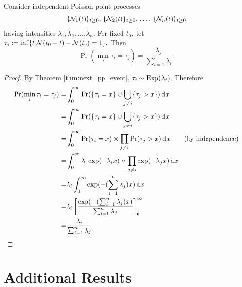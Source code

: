 \begin{theorem}
    \label{thm:which_ppp}
    Consider independent Poisson point processes
    $$\{\mathcal{N}_1(t)\}_{t\geq0},\, \{\mathcal{N}_2(t)\}_{t\geq0},\, \dots,\,
        \{\mathcal{N}_n(t)\}_{t\geq0}$$
    having intensities $\lambda_1, \lambda_2, \dots, \lambda_n.$ For fixed
    $t_0,$ let $\tau_i:=\inf\{t | \mathcal{N}(t_0 + t) - \mathcal{N}(t_0) = 1\}.$
    Then
    $$\Pr(\min_i{\tau_i} = \tau_j)
        = \frac{\lambda_j}{\sum_{i = 1}^n \lambda_i}.$$
\end{theorem}
\begin{proof}
    By Theorem \ref{thm:next_pp_event}, $\tau_i \sim \operatorname{Exp}(\lambda_i).$
    Therefore \begin{align*}
        \Pr(\min_i{\tau_i} = \tau_j) = & \int_0^\infty \Pr(\{\tau_i = x\} \cup \bigcup_{j\neq i}\{\tau_j > x\}) \diff x                    \\
        =                              & \int_0^\infty \Pr(\{\tau_i = x\} \cup \bigcup_{j\neq i}\{\tau_j > x\}) \diff x                    \\
        =                              & \int_0^\infty \Pr(\tau_i = x)\times \prod_{j\neq i}\Pr(\tau_j > x) \diff x\tag{by independence}   \\
        =                              & \int_0^\infty \lambda_i\exp(-\lambda_i x) \times \prod_{j\neq i}\exp(-\lambda_j x) \diff x        \\
        =                              & \lambda_i\int_0^\infty \exp(-(\sum_{i = 1}^n\lambda_j) x) \diff x                                 \\
        =                              & \lambda_i\left[\frac{\exp(-(\sum_{i = 1}^n\lambda_j) x)}{\sum_{i = 1}^n\lambda_j}\right]_0^\infty \\
        =                              & \frac{\lambda_i}{\sum_{i = 1}^n\lambda_j}
    \end{align*}
\end{proof}

\chapter{Additional Results}

